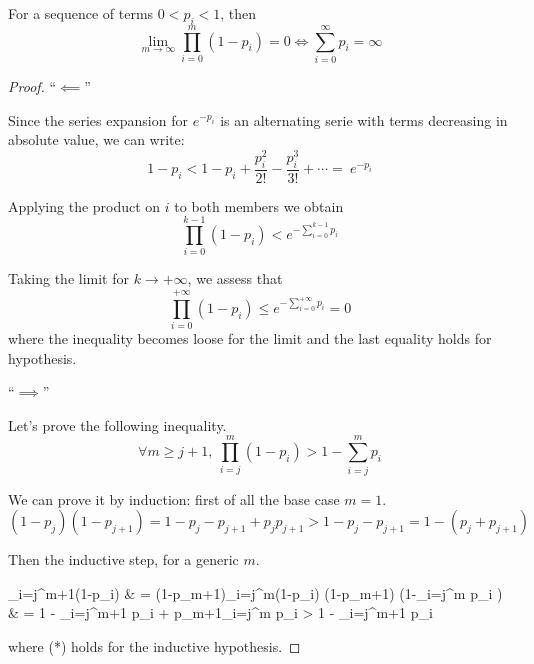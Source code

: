 	\begin{lemma}[4.1]
	  For a sequence of terms $0 < p_i < 1$, then
		\begin{equation}
			\lim_{m \to \infty} \prod_{i=0}^{m}\left( 1-p_i \right) = 0
			\iff \sum_{i=0}^\infty p_i = \infty
		\end{equation}
	\end{lemma}

	\begin{proof}
		\proofpart ``$\impliedby$''

			Since the series expansion for $e^{-p_i}$ is an alternating serie with terms decreasing in absolute value, we can write:
			\begin{equation*}
				1-p_i < 1-p_i + \frac{p_i^2}{2!} - \frac{p_i^3}{3!} + \cdots = ~e^{-p_i}
			\end{equation*}

			Applying the product on $i$ to both members we obtain
			\begin{equation*}
				\prod_{i=0}^{k-1} \left( 1-p_i \right) < e^{-\sum_{i=0}^{k-1}p_i}
			\end{equation*}

			Taking the limit for $k \to +\infty$, we assess that
			\begin{equation*}
				\prod_{i=0}^{+\infty} \left( 1-p_i \right)
					\le e^{-\sum_{i=0}^{+\infty} p_i}
					= 0
			\end{equation*}
			where the inequality becomes loose for the limit and the last equality holds for hypothesis.

		\proofpart ``$\implies$''

		Let's prove the following inequality.
		\begin{equation*}
			\forall m \ge j+1, ~ \prod_{i=j}^m(1-p_i) > 1-\sum_{i=j}^m p_i
		\end{equation*}

		We can prove it by induction: first of all the base case $m=1$.
		\begin{equation*}
			(1-p_j)(1-p_{j+1})
				= 1-p_j - p_{j+1} + p_j p_{j+1}
				> 1-p_j - p_{j+1}
				= 1- (p_j + p_{j+1})
		\end{equation*}

		Then the inductive step, for a generic $m$.
		\begin{esp*}
			\prod_{i=j}^{m+1}(1-p_i)
				& = (1-p_{m+1})\prod_{i=j}^m(1-p_i)
					\stackrel{(*)}{>} (1-p_{m+1}) \left(1-\sum_{i=j}^m p_i \right) \\
				& = 1 - \sum_{i=j}^{m+1} p_i + p_{m+1}\sum_{i=j}^m p_i
					> 1 - \sum_{i=j}^{m+1} p_i
		\end{esp*}
		where (*) holds for the inductive hypothesis.


\end{proof}
